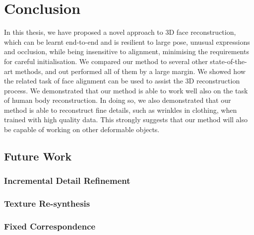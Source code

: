 \chapter{Conclusion}
\label{chapter:conclusion}



In this thesis, we have proposed a novel approach to 3D face
reconstruction, which can be learnt end-to-end and is resilient to
large pose, unusual expressions and occlusion, while being insensitive
to alignment, minimising the requirements for careful
initialisation. We compared our method to several other
state-of-the-art methods, and out performed all of them by a large
margin. We showed how the related task of face alignment can be used
to assist the 3D reconstruction process. We demonstrated that our
method is able to work well also on the task of human body
reconstruction. In doing so, we also demonstrated that our method is
able to reconstruct fine details, such as wrinkles in clothing, when
trained with high quality data. This strongly suggests that our method
will also be capable of working on other deformable objects.



\section{Future Work}


\subsection{Incremental Detail Refinement} %

\subsection{Texture Re-synthesis}

\subsection{Fixed Correspondence}




